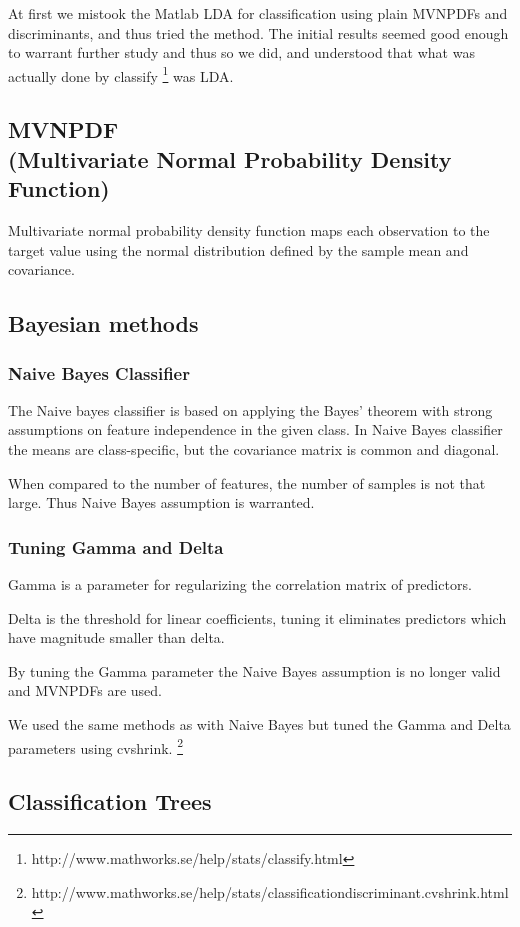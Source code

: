 \documentclass[a4paper,10pt]{article}
\begin{document}
At first we mistook the Matlab LDA for classification using plain MVNPDFs and discriminants, and thus tried the method. The initial results seemed good enough to warrant further study and thus so we did, and understood that what was actually done by classify \footnote{http://www.mathworks.se/help/stats/classify.html} was LDA.

\subsection{MVNPDF\\ {\small (Multivariate Normal Probability Density Function)}}
Multivariate normal probability density function maps each observation to the target value using the normal distribution defined by the sample mean and covariance.

\subsection{Bayesian methods}
\subsubsection{Naive Bayes Classifier}
The Naive bayes classifier is based on applying the Bayes’ theorem with strong assumptions on feature independence in the given class. In Naive Bayes classifier the means are class-specific, but the covariance matrix is common and diagonal.

When compared to the number of features, the number of samples is not that large. Thus Naive Bayes assumption is warranted.

\subsubsection{Tuning Gamma and Delta}

Gamma is a parameter for regularizing the correlation matrix of predictors.

Delta is the threshold for linear coefficients, tuning it eliminates predictors which have magnitude smaller than delta.

By tuning the Gamma parameter the Naive Bayes assumption is no longer valid and MVNPDFs are used.

We used the same methods as with Naive Bayes but tuned the Gamma and Delta parameters using cvshrink. \footnote{http://www.mathworks.se/help/stats/classificationdiscriminant.cvshrink.html}

\subsection{Classification Trees}
\end{document}
